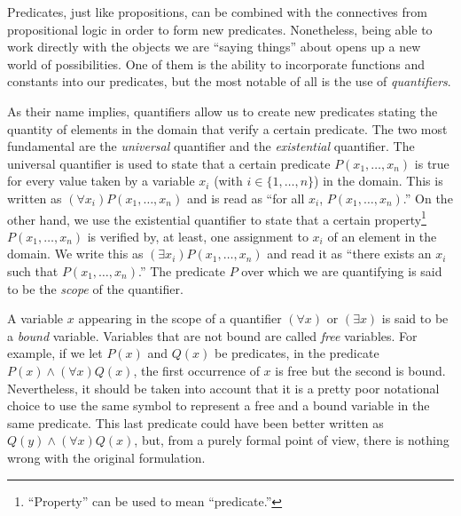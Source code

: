 \begin{para}
Predicates, just like propositions, can be combined with the connectives from propositional logic in order to form new predicates.
Nonetheless, being able to work directly with the objects we are ``saying things'' about opens up a new world of possibilities.
One of them is the ability to incorporate functions and constants into our predicates, but the most notable of all is the use of \emph{quantifiers}.

As their name implies, quantifiers allow us to create new predicates stating the quantity of elements in the domain that verify a certain predicate. The two most fundamental are the \emph{universal} quantifier and the \emph{existential} quantifier.
The universal quantifier is used to state that a certain predicate $P(x_1,\ldots,x_n)$ is true for every value taken by a variable $x_i$ (with $i\in\{1,\ldots,n\}$) in the domain. This is written as $(\forall x_i)P(x_1,\ldots,x_n)$ and is read as ``for all $x_i$, $P(x_1,\ldots,x_n)$.''
On the other hand, we use the existential quantifier to state that a certain property\footnote{``Property'' can be used to mean ``predicate.''} $P(x_1,\ldots,x_n)$ is verified by, at least, one assignment to $x_i$ of an element in the domain. We write this as $(\exists x_i)P(x_1,\ldots,x_n)$ and read it as ``there exists an $x_i$ such that $P(x_1,\ldots,x_n)$.''
The predicate $P$ over which we are quantifying is said to be the \emph{scope} of the quantifier.

A variable $x$ appearing in the scope of a quantifier $(\forall x)$ or $(\exists x)$ is said to be a \emph{bound} variable. Variables that are not bound are called \emph{free} variables. For example, if we let $P(x)$ and $Q(x)$ be predicates, in the predicate $P(x) \land (\forall x)Q(x)$, the first occurrence of $x$ is free but the second is bound.
Nevertheless, it should be taken into account that it is a pretty poor notational choice to use the same symbol to represent a free and a bound variable in the same predicate. This last predicate could have been better written as $Q(y) \land (\forall x)Q(x)$, but, from a purely formal point of view, there is nothing wrong with the original formulation.
\end{para}

